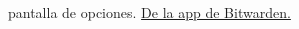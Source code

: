 \begin{multicols}{2}[]
\begin{figure}[H]
        \caption{pantalla de opciones. \href{https://play.google.com/store/apps/details?id=com.x8bit.bitwarden}{De la app de Bitwarden.}}
        \label{fig:bitapp-options}
    \end{figure}
\end{multicols}

